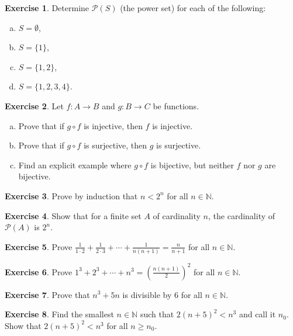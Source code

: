 \documentclass[12pt]{book}
\newcommand{\N}{{\mathbb{N}}}
\newcommand{\sP}{{\mathcal{P}}}
\theoremstyle{plain}
\theoremstyle{remark}
\theoremstyle{definition}
\theoremstyle{exercise}
\newtheorem{exercise}{Exercise}[section]
\theoremstyle{example}
\begin{document}
\begin{samepage}
\begin{exercise}
Determine $\sP(S)$ (the power set) for each of the following:
\begin{enumerate}[a)]
\item $S = \emptyset$,
\item $S = \{1\}$,
\item $S = \{1,2\}$,
\item $S = \{1,2,3,4\}$.
\end{enumerate}
\end{exercise}
\end{samepage}


\begin{exercise}
Let $f \colon A \to B$ and $g \colon B \to C$ be functions.
\begin{enumerate}[a)]
\item
Prove that if $g \circ f$ is injective, then $f$ is injective.
\item
Prove that if $g \circ f$ is surjective, then $g$ is surjective.
\item
Find an explicit example where $g \circ f$ is bijective, but neither $f$
nor $g$ are bijective.
\end{enumerate}
\end{exercise}

\begin{exercise}
Prove by induction that $n < 2^n$ for all $n \in \N$.
\end{exercise}

\begin{exercise}
Show that for a finite set $A$ of cardinality $n$, the cardinality
of $\sP(A)$ is $2^n$.
\end{exercise}

\begin{exercise}
Prove $\frac{1}{1\cdot 2} + 
\frac{1}{2\cdot 3} + \cdots + \frac{1}{n(n+1)} = \frac{n}{n+1}$
for all $n \in \N$.
\end{exercise}

\begin{exercise}
Prove $1^3 + 2^3 + \cdots + n^3 = {\left( \frac{n(n+1)}{2} \right)}^2$
for all $n \in \N$.
\end{exercise}

\begin{exercise}
Prove that $n^3 + 5n$ is divisible by $6$ for all $n \in \N$.
\end{exercise}

\begin{exercise}
Find the smallest $n \in \N$ such that $2{(n+5)}^2 < n^3$ and call it $n_0$.
Show that $2{(n+5)}^2 < n^3$ for all $n \geq n_0$.
\end{exercise}
\end{document}
